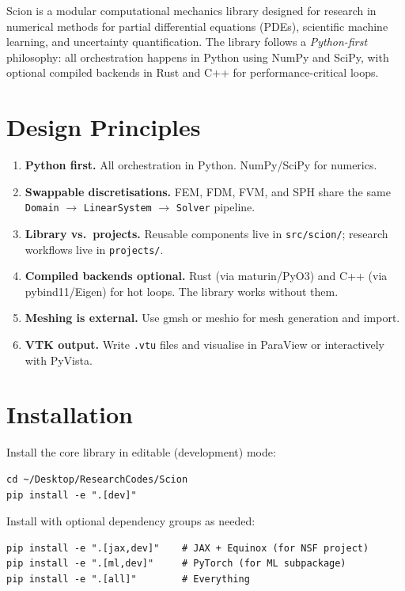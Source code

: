 \documentclass[11pt,a4paper]{report}
\begin{document}
Scion is a modular computational mechanics library designed for research in numerical methods for partial differential equations (PDEs), scientific machine learning, and uncertainty quantification. The library follows a \emph{Python-first} philosophy: all orchestration happens in Python using NumPy and SciPy, with optional compiled backends in Rust and C++ for performance-critical loops.

\section{Design Principles}

\begin{enumerate}[leftmargin=2em]
    \item \textbf{Python first.} All orchestration in Python. NumPy/SciPy for numerics.
    \item \textbf{Swappable discretisations.} FEM, FDM, FVM, and SPH share the same \texttt{Domain} $\to$ \texttt{LinearSystem} $\to$ \texttt{Solver} pipeline.
    \item \textbf{Library vs.\ projects.} Reusable components live in \texttt{src/scion/}; research workflows live in \texttt{projects/}.
    \item \textbf{Compiled backends optional.} Rust (via maturin/PyO3) and C++ (via pybind11/Eigen) for hot loops. The library works without them.
    \item \textbf{Meshing is external.} Use gmsh or meshio for mesh generation and import.
    \item \textbf{VTK output.} Write \texttt{.vtu} files and visualise in ParaView or interactively with PyVista.
\end{enumerate}

\section{Installation}

Install the core library in editable (development) mode:

\begin{lstlisting}[style=bash]
cd ~/Desktop/ResearchCodes/Scion
pip install -e ".[dev]"
\end{lstlisting}

Install with optional dependency groups as needed:

\begin{lstlisting}[style=bash]
pip install -e ".[jax,dev]"    # JAX + Equinox (for NSF project)
pip install -e ".[ml,dev]"     # PyTorch (for ML subpackage)
pip install -e ".[all]"        # Everything
\end{lstlisting}
\end{document}
